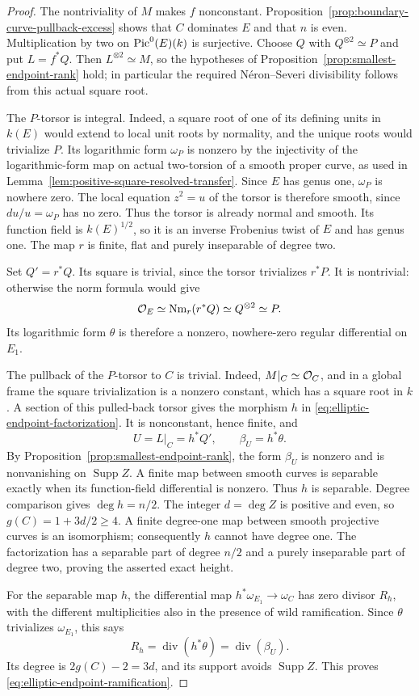 \begin{proof}
The nontriviality of $M$ makes $f$ nonconstant.
Proposition~\ref{prop:boundary-curve-pullback-excess} shows that $C$
dominates $E$ and that $n$ is even.  Multiplication by two on
$\operatorname{Pic}^0(E)(k)$ is surjective.  Choose $Q$ with $Q^{\otimes2}\simeq P$
and put $L=f^*Q$.  Then $L^{\otimes2}\simeq M$, so the hypotheses
of Proposition~\ref{prop:smallest-endpoint-rank} hold; in particular
the required N\'eron--Severi divisibility follows from this actual
square root.

The $P$-torsor is integral.  Indeed, a square root of one of its
defining units in $k(E)$ would extend to local unit roots by normality,
and the unique roots would trivialize $P$.  Its logarithmic form
$\omega_P$ is nonzero by the injectivity of the logarithmic-form map
on actual two-torsion of a smooth proper curve, as used in
Lemma~\ref{lem:positive-square-resolved-transfer}.
Since $E$ has genus one, $\omega_P$ is nowhere zero.
The local equation $z^2=u$ of the torsor is therefore smooth, since
$du/u=\omega_P$ has no zero.  Thus the torsor is already normal and
smooth.  Its function field is $k(E)^{1/2}$, so it is an inverse
Frobenius twist of $E$ and has genus one.  The map $r$ is finite,
flat and purely inseparable of degree two.

Set $Q'=r^*Q$.  Its square is trivial, since the torsor trivializes
$r^*P$.  It is nontrivial: otherwise the norm formula would give
\[
 \mathcal O_E\simeq\operatorname{Nm}_r(r^*Q)
       \simeq Q^{\otimes2}\simeq P.
\]
Its logarithmic form $\theta$ is therefore a nonzero, nowhere-zero
regular differential on $E_1$.

The pullback of the $P$-torsor to $C$ is trivial.  Indeed,
$M|_C\simeq\mathcal O_C$, and in a global frame the square trivialization
is a nonzero constant, which has a square root in $k$.
A section of this pulled-back torsor gives the morphism $h$ in
\eqref{eq:elliptic-endpoint-factorization}.
It is nonconstant, hence finite, and
\[
 U=L|_C=h^*Q',\qquad \beta_U=h^*\theta.
\]
By Proposition~\ref{prop:smallest-endpoint-rank}, the form $\beta_U$
is nonzero and is nonvanishing on $\operatorname{Supp}Z$.
A finite map between smooth curves is separable exactly when its
function-field differential is nonzero.  Thus $h$ is separable.
Degree comparison gives $\deg h=n/2$.
The integer $d=\deg Z$ is positive and even, so
$g(C)=1+3d/2\geq4$.
A finite degree-one map between smooth projective curves is an
isomorphism; consequently $h$ cannot have degree one.
The factorization has a separable part of degree $n/2$ and a purely
inseparable part of degree two, proving the asserted exact height.

For the separable map $h$, the differential map
$h^*\omega_{E_1}\to\omega_C$ has zero divisor $R_h$, with the
different multiplicities also in the presence of wild ramification.
Since $\theta$ trivializes $\omega_{E_1}$, this says
\[
 R_h=\operatorname{div}(h^*\theta)
    =\operatorname{div}(\beta_U).
\]
Its degree is $2g(C)-2=3d$, and its support avoids
$\operatorname{Supp}Z$.  This proves
\eqref{eq:elliptic-endpoint-ramification}.
\end{proof}

